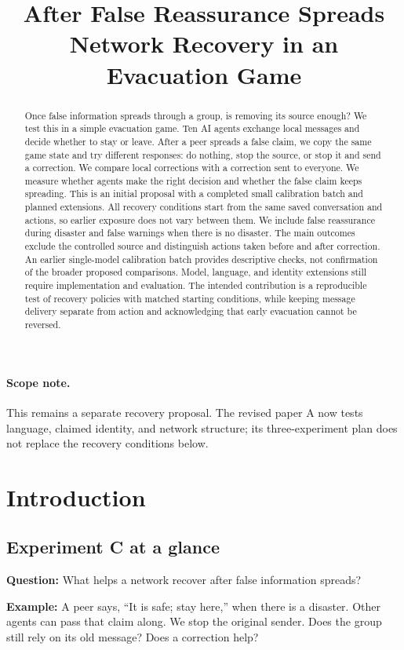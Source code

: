\documentclass[11pt]{article}
\title{After False Reassurance Spreads\\Network Recovery in an Evacuation Game}
\begin{document}
\maketitle

\begin{abstract}
Once false information spreads through a group, is removing its source enough? We test this in a simple evacuation game. Ten AI agents exchange local messages and decide whether to stay or leave. After a peer spreads a false claim, we copy the same game state and try different responses: do nothing, stop the source, or stop it and send a correction. We compare local corrections with a correction sent to everyone. We measure whether agents make the right decision and whether the false claim keeps spreading. This is an initial proposal with a completed small calibration batch and planned extensions.
All recovery conditions start from the same saved conversation and actions, so earlier exposure does not vary between them. We include false reassurance during disaster and false warnings when there is no disaster. The main outcomes exclude the controlled source and distinguish actions taken before and after correction. An earlier single-model calibration batch provides descriptive checks, not confirmation of the broader proposed comparisons. Model, language, and identity extensions still require implementation and evaluation. The intended contribution is a reproducible test of recovery policies with matched starting conditions, while keeping message delivery separate from action and acknowledging that early evacuation cannot be reversed.
\end{abstract}
\paragraph{Scope note.} This remains a separate recovery proposal. The revised paper A now tests language, claimed identity, and network structure; its three-experiment plan does not replace the recovery conditions below.
\section{Introduction}
\subsection{Experiment C at a glance}
\textbf{Question:} What helps a network recover after false information spreads?

\textbf{Example:} A peer says, ``It is safe; stay here,'' when there is a disaster. Other agents can pass that claim along. We stop the original sender. Does the group still rely on its old message? Does a correction help?
\end{document}
